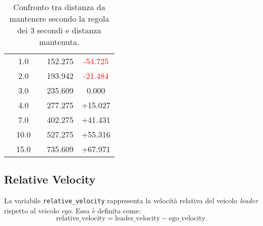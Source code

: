 \begin{table}[h!]
{\begin{tabular}{|c|c|c|c|c|}
                     & 1.0 &  & 152.275 & \textcolor{red}{-54.725} \\
                     & 2.0 &  & 193.942 & \textcolor{red}{-21.484} \\
                     & 3.0 &  & 235.609 & 0.000   \\
                     & 4.0 &  & 277.275 & \textcolor[rgb]{0.0,0.5,0.0}{+15.027}  \\
                     & 7.0 &  & 402.275 & \textcolor[rgb]{0.0,0.5,0.0}{+41.431}  \\
                     & 10.0 &  & 527.275 & \textcolor[rgb]{0.0,0.5,0.0}{+55.316} \\
                     & 15.0 &  & 735.609 & \textcolor[rgb]{0.0,0.5,0.0}{+67.971} \\
\hline
\end{tabular}
}
\caption{Confronto tra distanza da mantenere secondo la regola dei 3 secondi e distanza mantenuta.}
\label{tab:d_sicurezza_mantenuta}
\end{table}

\subsection{Relative Velocity}
La variabile \texttt{relative\_velocity} rappresenta la velocità relativa del veicolo \emph{leader} rispetto al veicolo \emph{ego}.
Essa è definita come:
\[
\text{relative\_velocity} = \text{leader\_velocity} - \text{ego\_velocity}.
\]
